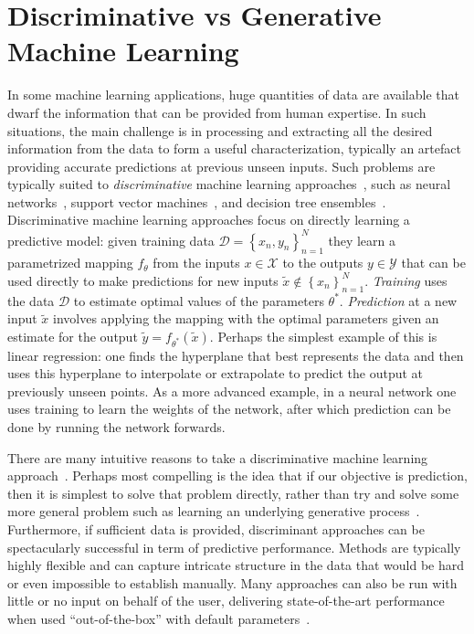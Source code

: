 
\section{Discriminative vs Generative Machine Learning}
\label{sec:bayes:discrim}

In some machine learning applications, huge quantities of data are available that dwarf the information
that can be provided from human expertise.  In such situations, the main challenge is in processing
and extracting all the desired information from the data to form a useful characterization,
typically an artefact providing accurate predictions at previous unseen inputs. 
Such problems are typically suited to \emph{discriminative} 
machine learning approaches~\citep{breiman2001statistical,vapnik1998statistical}, such as neural
networks~\citep{rumelhart1986learning,bishop1995neural}, 
support vector machines~\citep{cortes1995support,scholkopf2002learning}, and decision tree 
ensembles~\citep{breiman2001random,rainforth2015canonical}.  Discriminative machine learning approaches
focus on directly learning a predictive model: given training data $\mathcal{D} = \left\{x_n,y_n\right\}_{n=1}^N$
they learn a parametrized mapping $f_{\theta}$ from the inputs $x \in \mathcal{X}$ to the 
outputs $y\in\mathcal{Y}$ that can 
be used directly to make predictions 
for new inputs $\tilde{x} \notin \left\{x_n\right\}_{n=1}^N$.  \emph{Training}
uses the data $\mathcal{D}$ to estimate optimal values of the parameters $\theta^*$. \emph{Prediction}
at a new input $\tilde{x}$ involves applying the mapping with the optimal parameters given an estimate for the output
$\tilde{y} = f_{\theta^*}(\tilde{x})$.  Perhaps the simplest example of this is linear regression: one finds
the hyperplane that best represents the data and then uses this hyperplane to interpolate or extrapolate
to predict the output at previously unseen points.  
As a more advanced example, in a neural network one uses training to learn the
weights of the network, after which prediction can be done by running the network forwards.  

There are many intuitive reasons to take a discriminative machine learning 
approach~\citep{breiman2001statistical}.  Perhaps most compelling is the
idea that if our objective is prediction, then it is simplest to solve that problem directly, rather
than try and solve some more general problem such as learning an underlying generative 
process~\citep{vapnik1998statistical}. Furthermore, if sufficient
data is provided, discriminant approaches can be spectacularly successful in term of predictive
performance.  Methods are typically highly flexible and can capture intricate structure in the data that
would be hard or even impossible to establish manually.  Many approaches can also be run with little
or no input on behalf of the user, delivering state-of-the-art performance when used
``out-of-the-box'' with default parameters~\citep{rainforth2015canonical}.  

